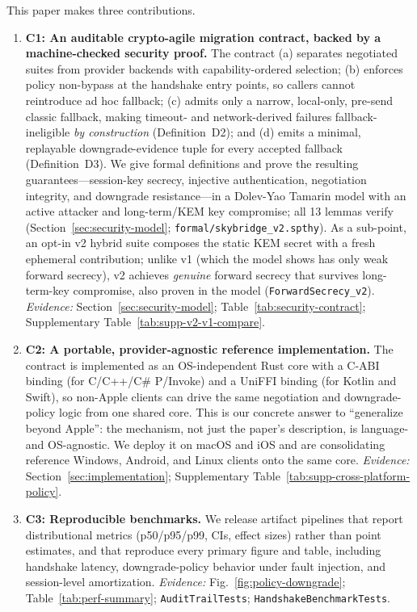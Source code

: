 \documentclass[10pt,journal,compsoc]{IEEEtran}
\begin{document}
This paper makes three contributions.

\begin{enumerate}
\item
  \textbf{C1: An auditable crypto-agile migration contract, backed by a
  machine-checked security proof.} The contract (a) separates negotiated
  suites from provider backends with capability-ordered selection; (b)
  enforces policy non-bypass at the handshake entry points, so callers
  cannot reintroduce ad hoc fallback; (c) admits only a narrow,
  local-only, pre-send classic fallback, making timeout- and
  network-derived failures fallback-ineligible \emph{by construction}
  (Definition~D2); and (d) emits a minimal, replayable downgrade-evidence
  tuple for every accepted fallback (Definition~D3). We give formal
  definitions and prove the resulting guarantees---session-key secrecy,
  injective authentication, negotiation integrity, and downgrade
  resistance---in a Dolev-Yao Tamarin model with an active attacker and
  long-term/KEM key compromise; all 13 lemmas verify
  (Section~\ref{sec:security-model};
  \texttt{formal/skybridge\_v2.spthy}). As a sub-point, an opt-in v2
  hybrid suite composes the static KEM secret with a fresh ephemeral
  contribution; unlike v1 (which the model shows has only weak forward
  secrecy), v2 achieves \emph{genuine} forward secrecy that survives
  long-term-key compromise, also proven in the model
  (\texttt{ForwardSecrecy\_v2}). \textit{Evidence:}
  Section~\ref{sec:security-model};
  Table~\ref{tab:security-contract};
  Supplementary Table~\ref{tab:supp-v2-v1-compare}.
\item
  \textbf{C2: A portable, provider-agnostic reference implementation.}
  The contract is implemented as an OS-independent Rust core with a
  C-ABI binding (for C/C++/C\# P/Invoke) and a UniFFI binding (for
  Kotlin and Swift), so non-Apple clients can drive the same negotiation
  and downgrade-policy logic from one shared core. This is our concrete
  answer to ``generalize beyond Apple'': the mechanism, not just the
  paper's description, is language- and OS-agnostic. We deploy it on
  macOS and iOS and are consolidating reference Windows, Android, and
  Linux clients onto the same core. \textit{Evidence:}
  Section~\ref{sec:implementation};
  Supplementary Table~\ref{tab:supp-cross-platform-policy}.
\item
  \textbf{C3: Reproducible benchmarks.} We release artifact pipelines
  that report distributional metrics (p50/p95/p99, CIs, effect sizes)
  rather than point estimates, and that reproduce every primary figure
  and table, including handshake latency, downgrade-policy behavior under
  fault injection, and session-level amortization. \textit{Evidence:}
  Fig.~\ref{fig:policy-downgrade}; Table~\ref{tab:perf-summary};
  \texttt{AuditTrailTests};
  \texttt{Handshake\allowbreak Benchmark\allowbreak Tests}.
\end{enumerate}
\end{document}
